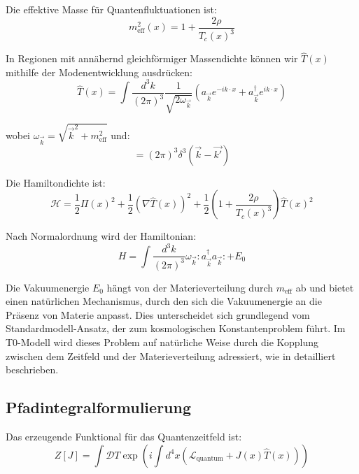 \documentclass[12pt,a4paper]{article}
\begin{document}
	Die effektive Masse für Quantenfluktuationen ist:
	\begin{equation}
		m_{\text{eff}}^2(x) = 1 + \frac{2\rho}{T_c(x)^3}
		\label{eq:effective_mass}
	\end{equation}
	
	In Regionen mit annähernd gleichförmiger Massendichte können wir $\hat{T}(x)$ mithilfe der Modenentwicklung ausdrücken:
	\begin{equation}
		\hat{T}(x) = \int \frac{d^3k}{(2\pi)^3} \frac{1}{\sqrt{2\omega_{\vec{k}}}} \left(a_{\vec{k}} e^{-ik \cdot x} + a_{\vec{k}}^{\dagger} e^{ik \cdot x}\right)
		\label{eq:mode_expansion}
	\end{equation}
	
	wobei $\omega_{\vec{k}} = \sqrt{\vec{k}^2 + m_{\text{eff}}^2}$ und:
	\begin{equation}
		[a_{\vec{k}}, a_{\vec{k'}}^{\dagger}] = (2\pi)^3 \delta^3(\vec{k} - \vec{k'})
		\label{eq:creation_annihilation}
	\end{equation}
	
	Die Hamiltondichte ist:
	\begin{equation}
		\mathcal{H} = \frac{1}{2}\Pi(x)^2 + \frac{1}{2}(\nabla \hat{T}(x))^2 + \frac{1}{2}\left(1 + \frac{2\rho}{T_c(x)^3}\right)\hat{T}(x)^2
		\label{eq:hamiltonian_density}
	\end{equation}
	
	Nach Normalordnung wird der Hamiltonian:
	\begin{equation}
		H = \int \frac{d^3k}{(2\pi)^3} \omega_{\vec{k}} :a_{\vec{k}}^{\dagger}a_{\vec{k}}: + E_0
		\label{eq:hamiltonian}
	\end{equation}
	
	Die Vakuumenergie $E_0$ hängt von der Materieverteilung durch $m_{\text{eff}}$ ab und bietet einen natürlichen Mechanismus, durch den sich die Vakuumenergie an die Präsenz von Materie anpasst. Dies unterscheidet sich grundlegend vom Standardmodell-Ansatz, der zum kosmologischen Konstantenproblem führt. Im T0-Modell wird dieses Problem auf natürliche Weise durch die Kopplung zwischen dem Zeitfeld und der Materieverteilung adressiert, wie in \cite{Pascher2025Energy} detailliert beschrieben.
	
	\subsection{Pfadintegralformulierung}
	\label{subsec:path_integral}
	
	Das erzeugende Funktional für das Quantenzeitfeld ist:
	\begin{equation}
		Z[J] = \int \mathcal{D}T \exp\left(i\int d^4x (\mathcal{L}_{\text{quantum}} + J(x)\hat{T}(x))\right)
		\label{eq:generating_functional}
	\end{equation}
	
\end{document}
